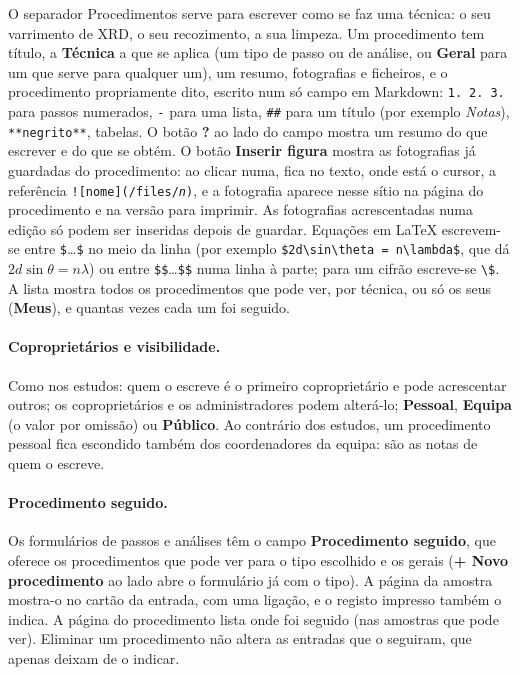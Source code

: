 \documentclass[11pt,a4paper]{article}
\newcommand{\ui}[1]{\textsf{\textbf{#1}}}
\newcommand{\menu}[1]{\textsf{#1}}
\begin{document}
O separador \menu{Procedimentos} serve para escrever como se faz uma
técnica: o seu varrimento de XRD, o seu recozimento, a sua limpeza. Um
procedimento tem título, a \ui{Técnica} a que se aplica (um tipo de passo ou
de análise, ou \ui{Geral} para um que serve para qualquer um), um resumo,
fotografias e ficheiros, e o procedimento propriamente dito, escrito num só
campo em Markdown: \texttt{1.}~\texttt{2.}~\texttt{3.} para passos numerados,
\texttt{-} para uma lista, \texttt{\#\#} para um título (por exemplo
\emph{Notas}), \texttt{**negrito**}, tabelas. O botão \ui{?} ao lado do
campo mostra um resumo do que escrever e do que se obtém. O botão
\ui{Inserir figura} mostra as fotografias já guardadas do procedimento: ao
clicar numa, fica no texto, onde está o cursor, a referência
\texttt{![nome](/files/\textit{n})}, e a fotografia aparece nesse sítio na
página do procedimento e na versão para imprimir. As fotografias
acrescentadas numa edição só podem ser inseridas depois de guardar.
Equações em \LaTeX{} escrevem-se entre \texttt{\$}\ldots\texttt{\$} no meio
da linha (por exemplo \verb|$2d\sin\theta = n\lambda$|, que dá
$2d\sin\theta = n\lambda$) ou entre \texttt{\$\$}\ldots\texttt{\$\$}
numa linha à parte; para um cifrão escreve-se \verb|\$|. A
lista mostra todos os procedimentos que pode ver, por técnica, ou só os seus
(\ui{Meus}), e quantas vezes cada um foi seguido.

\paragraph{Coproprietários e visibilidade.} Como nos estudos: quem o escreve
é o primeiro coproprietário e pode acrescentar outros; os coproprietários e
os administradores podem alterá-lo; \ui{Pessoal}, \ui{Equipa} (o valor por
omissão) ou \ui{Público}. Ao contrário dos estudos, um procedimento pessoal
fica escondido também dos coordenadores da equipa: são as notas de quem o
escreve.

\paragraph{Procedimento seguido.} Os formulários de passos e análises têm o
campo \ui{Procedimento seguido}, que oferece os procedimentos que pode ver
para o tipo escolhido e os gerais (\ui{+ Novo procedimento} ao lado abre o
formulário já com o tipo). A página da amostra mostra-o no cartão da entrada,
com uma ligação, e o registo impresso também o indica. A página do
procedimento lista onde foi seguido (nas amostras que pode ver). Eliminar um
procedimento não altera as entradas que o seguiram, que apenas deixam de o
indicar.
\end{document}
